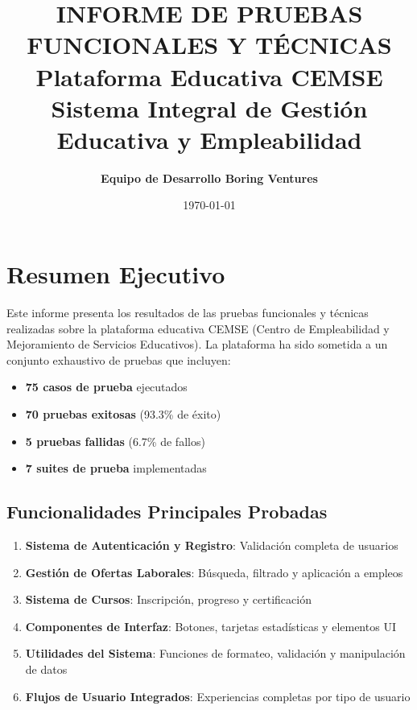 \documentclass[12pt,a4paper]{article}
\title{
    \vspace{2cm}
    {\huge \textbf{INFORME DE PRUEBAS FUNCIONALES Y TÉCNICAS}}\\[0.5cm]
    {\Large Plataforma Educativa CEMSE}\\[0.3cm]
    {\large Sistema Integral de Gestión Educativa y Empleabilidad}
}
\author{
    \textbf{Equipo de Desarrollo Boring Ventures}\\
}
\date{\today}
\begin{document}
\maketitle
\thispagestyle{empty}
\newpage

\tableofcontents
\newpage

\section{Resumen Ejecutivo}

Este informe presenta los resultados de las pruebas funcionales y técnicas realizadas sobre la plataforma educativa CEMSE (Centro de Empleabilidad y Mejoramiento de Servicios Educativos). La plataforma ha sido sometida a un conjunto exhaustivo de pruebas que incluyen:

\begin{itemize}
    \item \textcolor{primaryblue}{\textbf{75 casos de prueba}} ejecutados
    \item \textcolor{successgreen}{\textbf{70 pruebas exitosas}} (93.3\% de éxito)
    \item \textcolor{dangerred}{\textbf{5 pruebas fallidas}} (6.7\% de fallos)
    \item \textcolor{primaryblue}{\textbf{7 suites de prueba}} implementadas
\end{itemize}

\subsection{Funcionalidades Principales Probadas}
\begin{enumerate}
    \item \textbf{Sistema de Autenticación y Registro}: Validación completa de usuarios
    \item \textbf{Gestión de Ofertas Laborales}: Búsqueda, filtrado y aplicación a empleos
    \item \textbf{Sistema de Cursos}: Inscripción, progreso y certificación
    \item \textbf{Componentes de Interfaz}: Botones, tarjetas estadísticas y elementos UI
    \item \textbf{Utilidades del Sistema}: Funciones de formateo, validación y manipulación de datos
    \item \textbf{Flujos de Usuario Integrados}: Experiencias completas por tipo de usuario
\end{enumerate}
\end{document}
